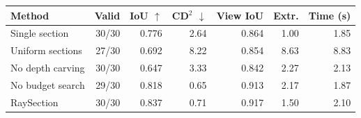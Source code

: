 \begin{tabular}{lrrrrrr}
\toprule
Method & Valid & IoU $\uparrow$ & CD$^2$ $\downarrow$ & View IoU & Extr. & Time (s) \\
\midrule
Single section & 30/30 & 0.776 & 2.64 & 0.864 & 1.00 & 1.85 \\
Uniform sections & 27/30 & 0.692 & 8.22 & 0.854 & 8.63 & 8.83 \\
No depth carving & 30/30 & 0.647 & 3.33 & 0.842 & 2.27 & 2.13 \\
No budget search & 29/30 & 0.818 & 0.65 & 0.913 & 2.17 & 1.87 \\
RaySection & 30/30 & 0.837 & 0.71 & 0.917 & 1.50 & 2.10 \\
\bottomrule
\end{tabular}
